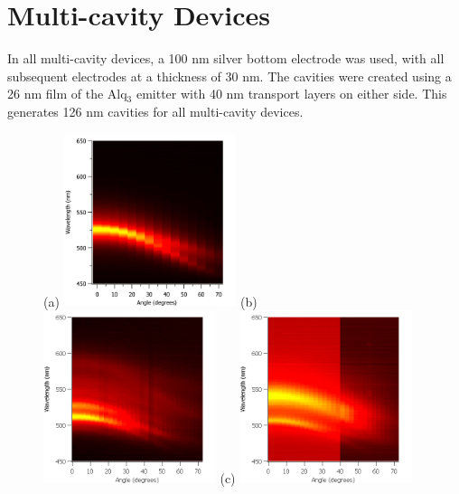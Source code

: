 \documentclass{report}
\begin{document}
    \section{Multi-cavity Devices} \label{n>1}
        In all multi-cavity devices, a 100 nm silver bottom electrode was used, with all subsequent electrodes at a thickness of 30 nm. The cavities were created using a 26 nm film of the Alq$_3$ emitter with 40 nm transport layers on either side. This generates 126 nm cavities for all multi-cavity devices.
		\begin{figure}[h!]
            \centering
            (a)
            \includegraphics[width=0.45\textwidth]{images/n2_heatmap.png}
            (b)
            \includegraphics[width=0.45\textwidth]{images/n3_heatmap.png}
            \newline
            (c)
            \includegraphics[width=0.45\textwidth]{images/n4_heatmap.png}

\end{figure}
\end{document}
